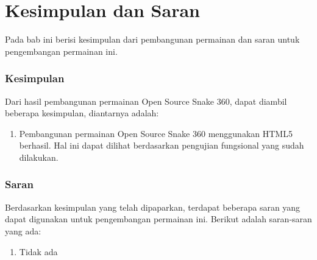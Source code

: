\chapter{Kesimpulan dan Saran}
\label{chap:kesimpulansaran}

Pada bab ini berisi kesimpulan dari pembangunan permainan dan saran untuk pengembangan permainan ini.

\subsection{Kesimpulan}
Dari hasil pembangunan permainan Open Source Snake 360, dapat diambil beberapa kesimpulan, diantarnya adalah: 

\begin{enumerate}
	\item Pembangunan permainan Open Source Snake 360 menggunakan HTML5 berhasil. Hal ini dapat dilihat berdasarkan pengujian fungsional yang sudah dilakukan.
\end{enumerate} 

\subsection{Saran}
Berdasarkan kesimpulan yang telah dipaparkan, terdapat beberapa saran yang dapat digunakan untuk pengembangan permainan ini. Berikut adalah saran-saran yang ada:

\begin{enumerate}
	\item Tidak ada
\end{enumerate}